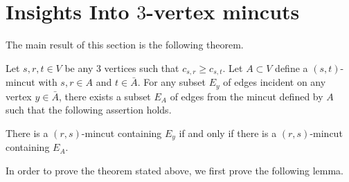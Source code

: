 \chapter{Insights Into $3$-vertex mincuts}
The main result of this section is the following theorem.


\begin{theorem}
Let $s,r,t\in V$ be any 3 vertices such that $c_{s,r}\ge c_{s,t}$. Let $A\subset V$ define a $(s,t)$-mincut with  $s,r\in A$ and $t\in \bar{A}$. For any subset $E_y$ of edges incident on any vertex $y\in \bar{A}$, there exists a subset $E_A$ of edges from the mincut defined by $A$ such that the following assertion holds.

There is a $(r,s)$-mincut containing $E_y$ if and only if there is a $(r,s)$-mincut containing $E_A$. 
\label{thm:query-transform}
\end{theorem}


\noindent
In order to prove the theorem stated above, we first prove the following lemma.

